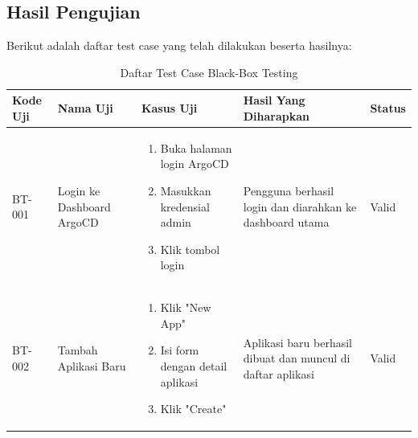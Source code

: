 \subsection{Hasil Pengujian}\label{subsec:hasil_pengujian}
Berikut adalah daftar test case yang telah dilakukan beserta hasilnya:
\begin{table}[h]
    \centering
    \caption{Daftar Test Case Black-Box Testing}
    \label{tab:test-case}
    \small
    \begin{adjustbox}{width=\textwidth}
        \begin{tabular}{|p{0.8cm}|p{2.2cm}|p{4cm}|p{3.5cm}|p{1.2cm}|}
            \hline
            \textbf{Kode Uji} & \textbf{Nama Uji}         & \textbf{Kasus Uji}                                                             & \textbf{Hasil Yang Diharapkan}                                     & \textbf{Status} \\
            \hline
            BT-001            & Login ke Dashboard ArgoCD & \begin{enumerate}[leftmargin=*,noitemsep,topsep=0pt,label=\arabic*.,widest=99]
                                                                \item Buka halaman login ArgoCD
                                                                \item Masukkan kredensial admin
                                                                \item Klik tombol login
                                                            \end{enumerate} & Pengguna berhasil login dan diarahkan ke dashboard utama           & Valid                                                                          \\ \hline
            BT-002            & Tambah Aplikasi Baru      & \begin{enumerate}[leftmargin=*,noitemsep,topsep=0pt,label=\arabic*.,widest=99]
                                                                \item Klik "New App"
                                                                \item Isi form dengan detail aplikasi
                                                                \item Klik "Create"
                                                            \end{enumerate} & Aplikasi baru berhasil dibuat dan muncul di daftar aplikasi        & Valid                                                                          \\ \hline

\end{tabular}
\end{adjustbox}
\end{table}
